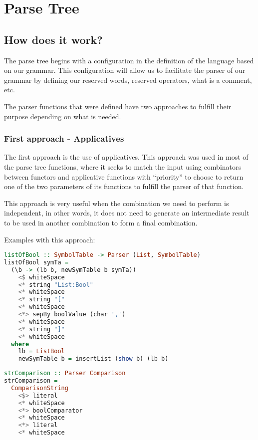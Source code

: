 \documentclass{article}
\begin{document}
\section*{Parse Tree}

\subsection*{How does it work?}
The parse tree begins with a configuration in the definition of the language based on our grammar. This configuration will allow us to facilitate the parser of our grammar by defining our reserved words, reserved operators, what is a comment, etc.

The parser functions that were defined have two approaches to fulfill their purpose depending on what is needed.

\subsubsection*{First approach - Applicatives}
The first approach is the use of applicatives. This approach was used in most of the parse tree functions, where it seeks to match the input using combinators between functors and applicative functions with ``priority'' to choose to return one of the two parameters of its functions to fulfill the parser of that function.

This approach is very useful when the combination we need to perform is independent, in other words, it does not need to generate an intermediate result to be used in another combination to form a final combination.

Examples with this approach:

\begin{lstlisting}[language=Haskell]
listOfBool :: SymbolTable -> Parser (List, SymbolTable)
listOfBool symTa =
  (\b -> (lb b, newSymTable b symTa))
    <$ whiteSpace
    <* string "List:Bool"
    <* whiteSpace
    <* string "["
    <* whiteSpace
    <*> sepBy boolValue (char ',')
    <* whiteSpace
    <* string "]"
    <* whiteSpace
  where
    lb = ListBool
    newSymTable b = insertList (show b) (lb b)
\end{lstlisting}

\begin{lstlisting}[language=Haskell]
strComparison :: Parser Comparison
strComparison =
  ComparisonString
    <$> literal
    <* whiteSpace
    <*> boolComparator
    <* whiteSpace
    <*> literal
    <* whiteSpace
\end{lstlisting}
\end{document}
